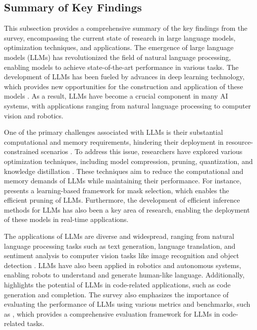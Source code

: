 \documentclass[11pt]{article}
\begin{document}
\subsection{Summary of Key Findings}

This subsection provides a comprehensive summary of the key findings from the survey, encompassing the current state of research in large language models, optimization techniques, and applications. The emergence of large language models (LLMs) \cite{ref33} has revolutionized the field of natural language processing, enabling models to achieve state-of-the-art performance in various tasks. The development of LLMs has been fueled by advances in deep learning technology, which provides new opportunities for the construction and application of these models \cite{ref33}. As a result, LLMs have become a crucial component in many AI systems, with applications ranging from natural language processing to computer vision and robotics.

One of the primary challenges associated with LLMs is their substantial computational and memory requirements, hindering their deployment in resource-constrained scenarios \cite{ref351}. To address this issue, researchers have explored various optimization techniques, including model compression, pruning, quantization, and knowledge distillation \cite{ref12}. These techniques aim to reduce the computational and memory demands of LLMs while maintaining their performance. For instance, \cite{ref86} presents a learning-based framework for mask selection, which enables the efficient pruning of LLMs. Furthermore, the development of efficient inference methods for LLMs \cite{ref11} has also been a key area of research, enabling the deployment of these models in real-time applications.

The applications of LLMs are diverse and widespread, ranging from natural language processing tasks such as text generation, language translation, and sentiment analysis \cite{ref44} to computer vision tasks like image recognition and object detection \cite{ref25}. LLMs have also been applied in robotics and autonomous systems, enabling robots to understand and generate human-like language. Additionally, \cite{ref352} highlights the potential of LLMs in code-related applications, such as code generation and completion. The survey also emphasizes the importance of evaluating the performance of LLMs using various metrics and benchmarks, such as \cite{ref201}, which provides a comprehensive evaluation framework for LLMs in code-related tasks.
\end{document}
